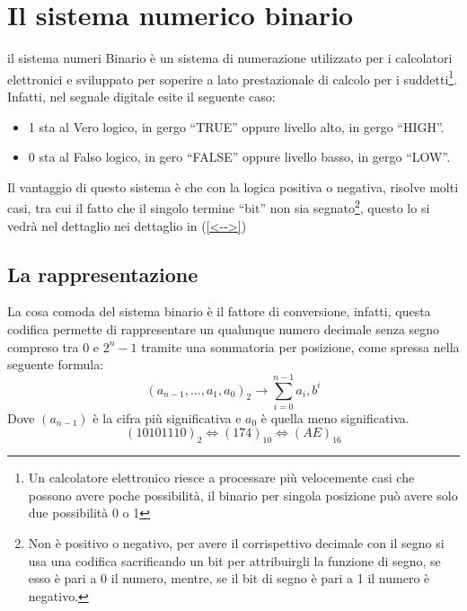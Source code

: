 \section{Il sistema numerico binario}
\label{sec:sistemanumbin}
\begin{defi}
  il sistema numeri Binario è un sistema di numerazione utilizzato per i calcolatori
  elettronici e sviluppato per soperire a lato prestazionale di calcolo per i
  suddetti\footnote{Un calcolatore elettronico riesce a processare più velocemente
    casi che possono avere poche possibilità, il binario per singola posizione può
    avere solo due possibilità 0 o 1}. Infatti, nel segnale digitale esite il seguente
  caso:
  \begin{itemize}
  \item 1 sta al Vero logico, in gergo ``TRUE'' oppure livello alto, in gergo ``HIGH''.
  \item 0 sta al Falso logico, in gero ``FALSE'' oppure livello basso, in gergo ``LOW''.
  \end{itemize}
  Il vantaggio di questo sistema è che con la logica positiva o negativa, risolve molti
  casi, tra cui il fatto che il singolo termine ``bit'' non sia segnato\footnote{Non è
    positivo o negativo, per avere il corrispettivo decimale con il segno si usa una
    codifica sacrificando un bit per attribuirgli la funzione di segno, se esso è pari a
    0 il numero, mentre, se il bit di segno è pari a 1 il numero è negativo.}, questo
  lo si vedrà nel dettaglio nei dettaglio in (\ref{<-->}) 
\end{defi}

\subsection{La rappresentazione}
\label{sec:rapbin}

La cosa comoda del sistema binario è il fattore di conversione, infatti, questa
codifica permette di rappresentare un qualunque numero decimale senza segno compreso
tra $0$ e $2^n-1$ tramite una sommatoria per posizione, come spressa nella seguente
formula:
\begin{equation}
  \label{eq:rappbin}
  (a_{n-1},\dots,a_1,a_0)_2\to \sum\limits^{n-1}_{i=0} a_i,b^i
\end{equation}
Dove $(a_{n-1})$ è la cifra più significativa e $a_0$ è quella meno significativa.
\begin{equation}
  \label{eq:esempiodiconversione}
  (10101110)_2\Leftrightarrow (174)_{10} \Leftrightarrow (AE)_{16}
\end{equation}

